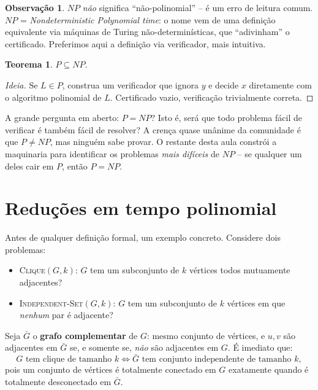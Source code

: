\documentclass[9pt,a4paper]{extarticle}
\newcommand{\impt}[1]{\textcolor{important}{\textbf{#1}}}
\newcommand{\ntc}[1]{\textcolor{notice}{#1}}
\newtheorem{theorem}{Teorema}[section]
\theoremstyle{definition}
\newtheorem{remark}{Observação}[section]
\begin{document}
\begin{remark}
\(NP\) \emph{não} significa \enquote{não-polinomial} -- é um erro de leitura comum. \(NP\) = \emph{Nondeterministic Polynomial time}: o nome vem de uma definição equivalente via máquinas de Turing não-determinísticas, que \enquote{adivinham} o certificado. Preferimos aqui a definição via verificador, mais intuitiva.
\end{remark}

\begin{theorem}
\(P \subseteq NP\).
\end{theorem}
\begin{proof}[Ideia]
Se \(L \in P\), construa um verificador que ignora \(y\) e decide \(x\) diretamente com o algoritmo polinomial de \(L\). Certificado vazio, verificação trivialmente correta.
\end{proof}

\ntc{A grande pergunta em aberto: \(P = NP\)? Isto é, será que todo problema fácil de verificar é também fácil de resolver? A crença quase unânime da comunidade é que \(P \neq NP\), mas ninguém sabe provar. O restante desta aula constrói a maquinaria para identificar os problemas \emph{mais difíceis} de \(NP\) -- se qualquer um deles cair em \(P\), então \(P = NP\).}

\section{Reduções em tempo polinomial}\label{sec:reducoes}

Antes de qualquer definição formal, um exemplo concreto. Considere dois problemas:

\begin{itemize}
\item \textsc{Clique}\((G,k)\): \(G\) tem um subconjunto de \(k\) vértices todos mutuamente adjacentes?
\item \textsc{Independent-Set}\((G,k)\): \(G\) tem um subconjunto de \(k\) vértices em que \emph{nenhum} par é adjacente?
\end{itemize}

Seja \(\bar G\) o \impt{grafo complementar} de \(G\): mesmo conjunto de vértices, e \(u,v\) são adjacentes em \(\bar G\) se, e somente se, \emph{não} são adjacentes em \(G\). É imediato que:
\[
G \text{ tem clique de tamanho } k \iff \bar G \text{ tem conjunto independente de tamanho } k,
\]
pois um conjunto de vértices é totalmente conectado em \(G\) exatamente quando é totalmente desconectado em \(\bar G\).
\end{document}
